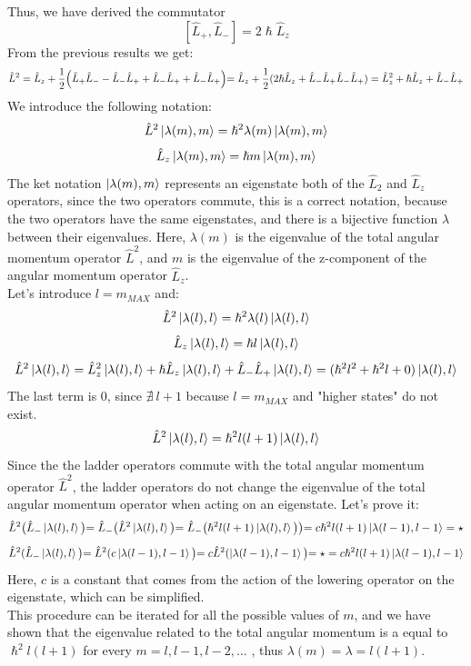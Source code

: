 \documentclass{article}
\begin{document}
Thus, we have derived the commutator $$[\hat{L}_+, \hat{L}_-] = 2 \hslash \hat{L}_z$$ 
From the previous results we get:
$$ \hat{L}^2 = \hat{L}_z + \frac{1}{2} \Bigl( \hat{L}_+ \hat{L}_{-} - \hat{L}_{-}\hat{L}_ + + \hat{L}_-\hat{L}_ + + \hat{L}_-\hat{L}_+ \Bigl) =\hat{L}_z + \frac{1}{2} ( 2 \hslash\hat{L}_z + \hat{L}_-\hat{L}_ + \hat{L}_-\hat{L}_+ ) = \hat{L}_z^2+ \hslash \hat{L}_z + \hat{L}_-\hat{L}_+$$
We introduce the following notation:
$$\hat{L}^2 \ket{\lambda(m),m} = \hslash^2 \lambda(m) \ket{\lambda(m),m}$$
$$\hat{L}_z \ket{\lambda(m),m} = \hslash m \ket{\lambda(m),m}$$
The ket notation $\ket{\lambda(m),m}$ represents an eigenstate both of the $\hat{L}_2$ and $\hat{L}_z$  operators, since the two operators commute, this is a correct notation, because the two operators have the same eigenstates, and there is a bijective function $\lambda$ between their eigenvalues. Here, $\lambda(m)$ is the eigenvalue of the total angular momentum operator $\hat{L}^2$, and $m$ is the eigenvalue of the z-component of the angular momentum operator $\hat{L}_z$.\\
Let's introduce  $l = m_{MAX}$ and: 
$$\hat{L}^2 \ket{\lambda(l),l} = \hslash^2 \lambda(l) \ket{\lambda(l),l}$$
$$\hat{L}_z \ket{\lambda(l),l} = \hslash l \ket{\lambda(l),l}$$
$$\hat{L}^2 \ket{\lambda(l),l} = \hat{L}_z^2 \ket{\lambda(l),l}+ \hslash \hat{L}_z \ket{\lambda(l),l} + \hat{L}_-\hat{L}_+ \ket{\lambda(l),l} =( \hslash^2 l^2 + \hslash^2 l + 0) \ket{\lambda(l),l} $$
The last term is $0$, since $\nexists \ l+1$ because $l = m_{MAX}$ and "higher states" do not exist.
$$\hat{L}^2 \ket{\lambda(l),l} = \hslash^2 l (l+1) \ket{\lambda(l),l}$$
Since the the ladder operators commute with the total angular momentum operator $\hat{L}^2$, the ladder operators do not change the eigenvalue of the total angular momentum operator when acting on an eigenstate. Let's prove it:
$$\hat{L}^2 \bigl( \hat{L}_{-} \ket{\lambda(l),l} \bigl) = \hat{L}_{-} \bigl( \hat{L}^2 \ket{\lambda(l),l} \bigl) = \hat{L}_{-} \bigl( \hslash^2 l(l+1)\ket{\lambda(l),l} \bigl) \bigl) = c \hslash^2 l (l+1) \ket{\lambda(l-1),l-1} = \star  $$
$$ \hat{L}^2 ( \hat{L}_-\ket{\lambda(l),l} \bigl) = \hat{L}^2 ( c \ket{\lambda(l-1),l-1} \bigl) = c  \hat{L}^2 ( \ket{\lambda(l-1),l-1} \bigl) = \star = c \hslash^2l(l+1) \ket{\lambda(l-1),l-1} $$
Here, $c$ is a constant that comes from the action of the lowering operator on the eigenstate, which can be simplified.\\
This procedure can be iterated for all the possible values of $m$, and we have shown that the eigenvalue related to the total angular momentum is a equal to $\hslash^2 l(l+1)$ for every $m= l,l-1,l-2, \dots$ , thus $\lambda(m) = \lambda = l(l+1)$. \\ \\
\end{document}
